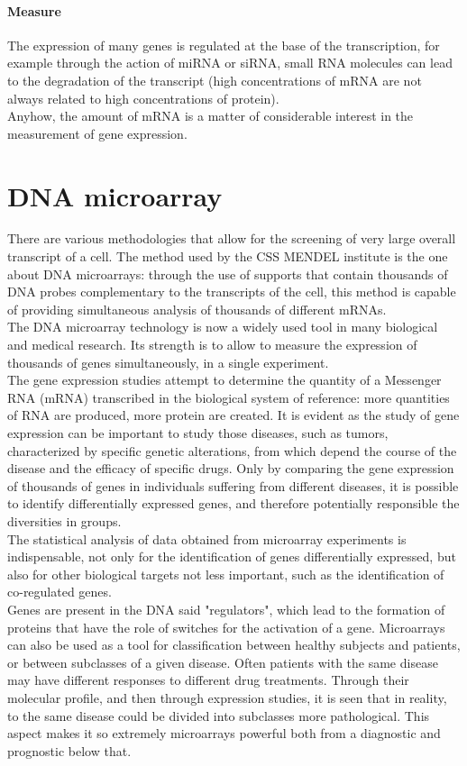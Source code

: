\documentclass[a4paper]{report}
\begin{document}
\paragraph{Measure}
The expression of many genes is regulated at the base of the transcription, for example through the action of miRNA or siRNA, small RNA molecules can lead to the degradation of the transcript (high concentrations of mRNA are not always related to high concentrations of protein).\\
Anyhow, the amount of mRNA is a matter of considerable interest in the measurement of gene expression.
\section{DNA microarray}
There are various methodologies that allow for the screening of very large overall transcript of a cell. The method used by the CSS MENDEL institute is the one about DNA microarrays: through the use of supports that contain thousands of DNA probes complementary to the transcripts of the cell, this method is capable of providing simultaneous analysis of thousands of different mRNAs.\\

The DNA microarray technology is now a widely used tool 
in many biological and medical research. Its strength is to allow to measure the expression of thousands of genes simultaneously, in a single experiment.\\
The gene expression studies attempt to determine the quantity of a Messenger RNA (mRNA) transcribed in the biological system of reference: more quantities of RNA are produced, more protein are created. It is evident as the study of gene expression can be important to study those diseases, such as tumors, characterized by specific genetic alterations, from which depend the course of the disease and the efficacy of specific drugs. Only by comparing the gene expression of thousands of genes in individuals suffering from different diseases, it is possible to identify differentially expressed genes, and therefore potentially responsible the diversities in groups.\\
The statistical analysis of data obtained from microarray experiments is indispensable, not only for the identification of genes differentially expressed, but also for other biological targets not less important, such as the identification of co-regulated genes.\\
Genes are present in the DNA said "regulators", which lead to the formation of proteins that have the role of switches for the activation of a gene. Microarrays can also be used as a tool for classification between healthy subjects and patients, or between subclasses of a given disease. Often patients with the same disease may have different responses to different drug treatments. Through their molecular profile, and then through expression studies, it is seen that in reality, to the same disease could be divided into subclasses more pathological. This aspect makes it so extremely microarrays powerful both from a diagnostic and prognostic below that.\\
\end{document}
